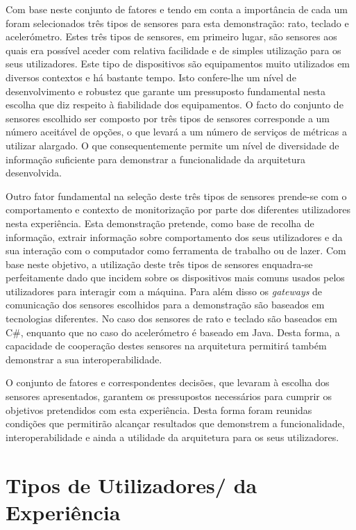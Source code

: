 Com base neste conjunto de fatores e tendo em conta a importância de cada um foram selecionados três tipos de sensores para esta demonstração: rato, teclado e acelerómetro. Estes três tipos de sensores, em primeiro lugar, são sensores aos quais era possível aceder com relativa facilidade e de simples utilização para os seus utilizadores. Este tipo de dispositivos são equipamentos muito utilizados em diversos contextos e há bastante tempo. Isto confere-lhe um nível de desenvolvimento e robustez que garante um pressuposto fundamental nesta escolha que diz respeito à fiabilidade dos equipamentos. O facto do conjunto de sensores escolhido ser composto por três tipos de sensores corresponde a um número aceitável de opções, o que levará a um número de serviços de métricas a utilizar alargado. O que consequentemente permite um nível de diversidade de informação suficiente para demonstrar a funcionalidade da arquitetura desenvolvida.

Outro fator fundamental na seleção deste três tipos de sensores prende-se com o comportamento e contexto de monitorização por parte dos diferentes utilizadores nesta experiência. Esta demonstração pretende, como base de recolha de informação, extrair informação sobre comportamento dos seus utilizadores e da sua interação com o computador como ferramenta de trabalho ou de lazer. Com base neste objetivo, a utilização deste três tipos de sensores enquadra-se perfeitamente dado que incidem sobre os dispositivos mais comuns usados pelos utilizadores para interagir com a máquina. Para além disso os \textit{gateways} de comunicação dos sensores escolhidos para a demonstração são baseados em tecnologias diferentes. No caso dos sensores de rato e teclado são baseados em C\#, enquanto que no caso do acelerómetro é baseado em Java. Desta forma, a capacidade de cooperação destes sensores na arquitetura permitirá também demonstrar a sua interoperabilidade.

O conjunto de fatores e correspondentes decisões, que levaram à escolha dos sensores apresentados, garantem os pressupostos necessários para cumprir os objetivos pretendidos com esta experiência. Desta forma foram reunidas condições que permitirão alcançar resultados que demonstrem a funcionalidade, interoperabilidade e ainda a utilidade da arquitetura para os seus utilizadores.

\section{Tipos de Utilizadores/ da Experiência}

